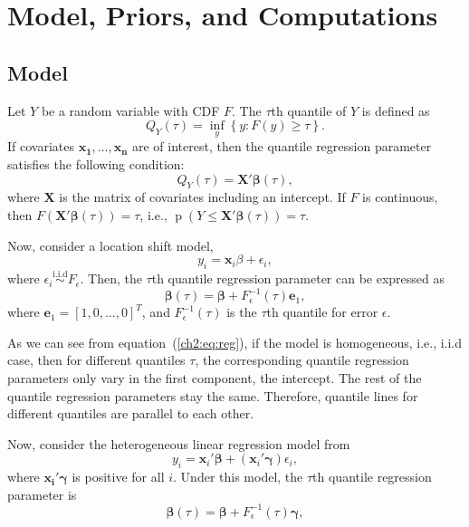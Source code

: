 \documentclass[12pt]{article}
\DeclareMathOperator{\pr}{p}
\begin{document}
\section{Model, Priors, and Computations}
\label{ch2:sec:model}
\subsection{Model}
Let $Y$ be a random variable with CDF $F$.  The $\tau$th quantile of
$Y$ is defined as
\begin{displaymath}
  Q_Y(\tau) = \underset{y}{\inf} \left\{ y: F(y) \ge \tau \right\}.
\end{displaymath}
If covariates $\bm{x_1, \ldots, x_n}$ are of interest, then the
quantile regression parameter satisfies the following condition:
\begin{displaymath}
  Q_Y(\tau) = \bm{X'\beta}(\tau),
\end{displaymath}
where $\bm{X}$ is the matrix of covariates including an intercept.  If
$F$ is continuous, then $F(\bm{X'\beta}(\tau)) = \tau$, i.e., $\pr(Y
\le \bm{X'\beta}(\tau)) = \tau$.

Now, consider a location shift model,
\begin{displaymath}
  y_i = \bm{x}_i\beta + \epsilon_i,
\end{displaymath}
where $\epsilon_i \stackrel{\mbox{i.i.d}}{\sim} F_{\epsilon}$. Then,
the $\tau$th quantile regression parameter can be expressed as
\begin{equation} \label{ch2:eq:reg} \bm{\beta}(\tau) = \bm{\beta} +
  F^{-1}_{\epsilon}(\tau) \bm{e}_1,
\end{equation}
where $\bm{e}_1 = [1, 0, \ldots, 0]^T$, and $F^{-1}_{\epsilon}(\tau)$
is the $\tau$th quantile for error $\epsilon$.

As we can see from equation~(\ref{ch2:eq:reg}), if the model is
homogeneous, i.e., i.i.d case, then for different quantiles $\tau$,
the corresponding quantile regression parameters only vary in the
first component, the intercept. The rest of the quantile regression
parameters stay the same. Therefore, quantile lines for different
quantiles are parallel to each other.

Now, consider the heterogeneous linear regression model from
\citet{he1998}
\begin{equation}\label{ch2:eq:he}
  y_i = \bm{x}_i'\bm{\beta} + (\bm{x}_i'\bm{\gamma}) \epsilon_i,
\end{equation}
where $\bm{x_i'\gamma}$ is positive for all $i$. Under this model, the
$\tau$th quantile regression parameter is
\begin{equation}\label{ch2:eq:quan}
  \bm{\beta}(\tau) = \bm{\beta} + F^{-1}_{\epsilon}(\tau) \bm{\gamma},
\end{equation}
\end{document}
